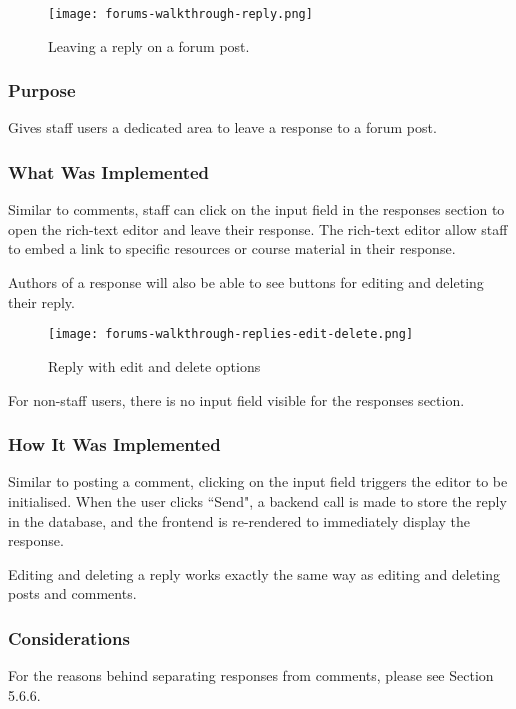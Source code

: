 \begin{figure}[h!]
    \texttt{[image: forums-walkthrough-reply.png]}
    \centering
    \caption{Leaving a reply on a forum post.}
\end{figure}

\subsubsection{Purpose}
Gives staff users a dedicated area to leave a response to a forum post.

\subsubsection{What Was Implemented}
Similar to comments, staff can click on the input field in the responses section to open the rich-text editor and leave their response.
The rich-text editor allow staff to embed a link to specific resources or course material in their response.

\newpage

Authors of a response will also be able to see buttons for editing and deleting their reply.

\begin{figure}[h!]
    \texttt{[image: forums-walkthrough-replies-edit-delete.png]}
    \centering
    \caption{Reply with edit and delete options}
\end{figure}

For non-staff users, there is no input field visible for the responses section.

\subsubsection{How It Was Implemented}
Similar to posting a comment, clicking on the input field triggers the editor to be initialised.
When the user clicks ``Send", a backend call is made to store the reply in the database, and the frontend is re-rendered to immediately display the response.

Editing and deleting a reply works exactly the same way as editing and deleting posts and comments.

\subsubsection{Considerations}
For the reasons behind separating responses from comments, please see Section 5.6.6.

